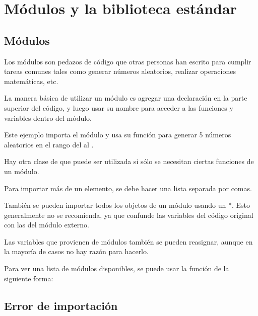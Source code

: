 \chapter{Módulos y la biblioteca estándar}

\section{Módulos}

Los módulos son pedazos de código que otras personas han escrito para cumplir tareas comunes tales como generar números aleatorios, realizar operaciones matemáticas, etc.
\medskip

La manera básica de utilizar un módulo es agregar una declaración  en la parte superior del código, y luego usar su nombre para acceder a las funciones y variables dentro del módulo.


Este ejemplo importa el módulo  y usa su función  para generar 5 números aleatorios en el rango del  al .
\medskip

Hay otra clase de  que puede ser utilizada si sólo se necesitan ciertas funciones de un módulo.


Para importar más de un elemento, se debe hacer una lista separada por comas.


También se pueden importar todos los objetos de un módulo usando un *.
Esto generalmente no se recomienda, ya que confunde las variables del código original con las del módulo externo.


Las variables que provienen de módulos también se pueden reasignar, aunque en la mayoría de casos no hay razón para hacerlo.


Para ver una lista de módulos disponibles, se puede usar la función  de la siguiente forma:


\section{Error de importación}

